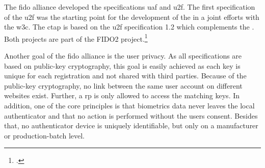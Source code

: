 The \gls{fido} alliance developed the specifications \gls{uaf} and \gls{u2f}. The first specification of the \gls{u2f} was the starting point for the development of the \wa{} in a joint efforts with the \gls{w3c}. The \gls{ctap} is based on the \gls{u2f} specification 1.2 which complements the \wa. Both projects are part of the FIDO2 project.\footcite[See][169--170]{grimes2017hacking}

Another goal of the \gls{fido} alliance is the user privacy. As all specifications are based on public-key cryptography, this goal is easily achieved as each key is unique for each registration and not shared with third parties. Because of the public-key cryptography, no link between the same user account on different websites exist. Further, a \gls{rp} is only allowed to access the matching keys. In addition, one of the core principles is that biometrics data never leaves the local authenticator and that no action is performed without the users consent. Besides that, no authenticator device is uniquely identifiable, but only on a manufacturer or production-batch level.